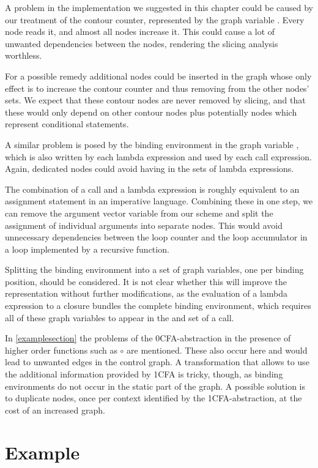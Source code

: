 \documentclass[a4paper,parskip=half,BCOR=8mm,DIV=calc,12pt]{scrbook}
\begin{document}
A problem in the implementation we suggested in this chapter could be caused by our treatment of the contour counter, represented by the graph variable . Every node reads it, and almost all nodes increase it. This could cause a lot of unwanted dependencies between the nodes, rendering the slicing analysis worthless.

For a possible remedy additional nodes could be inserted in the graph whose only effect is to increase the contour counter and thus removing  from the other nodes’  sets. We expect that these contour nodes are never removed by slicing, and that these would only depend on other contour nodes plus potentially nodes which represent conditional statements.

A similar problem is posed by the binding environment in the graph variable , which is also written by each lambda expression and used by each call expression. Again, dedicated nodes could avoid having  in the  sets of lambda expressions.

The combination of a call and a lambda expression is roughly equivalent to an assignment statement in an imperative language. Combining these in one step, we can remove the argument vector variable  from our scheme and split the assignment of individual arguments into separate nodes. This would avoid unnecessary dependencies between the loop counter and the loop accumulator in a loop implemented by a recursive function.

Splitting the binding environment into a set of graph variables, one per binding position, should be considered. It is not clear whether this will improve the representation without further modifications, as the evaluation of a lambda expression to a closure bundles the complete binding environment, which requires all of these graph variables to appear in the  and  set of a call.

In \cref{examplesection} the problems of the 0CFA-abstraction in the presence of higher order functions such as $\circ$ are mentioned. These also occur here and would lead to unwanted edges in the control graph. A transformation that allows to use the additional information provided by 1CFA is tricky, though, as binding environments do not occur in the static part of the graph. A possible solution is to duplicate nodes, once per context identified by the 1CFA-abstraction, at the cost of an increased graph.

\section{Example}
\end{document}
